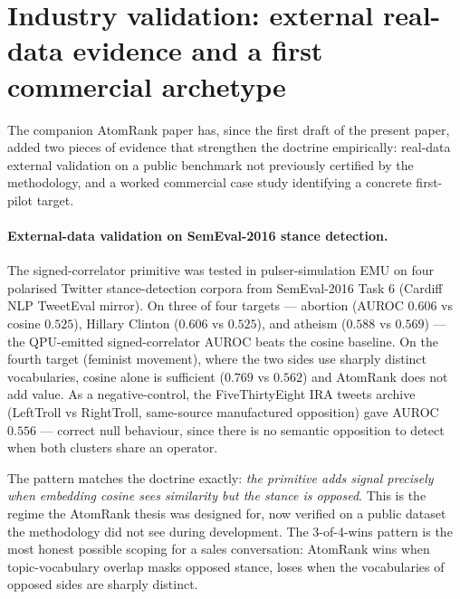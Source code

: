 \documentclass[10pt]{article}
\begin{document}
\section{Industry validation: external real-data evidence and a first commercial archetype}\label{sec:industry}

The companion AtomRank paper \cite{jurczak2026atomrank} has, since the first draft of the present paper, added two pieces of evidence that strengthen the doctrine empirically: real-data external validation on a public benchmark not previously certified by the methodology, and a worked commercial case study identifying a concrete first-pilot target.

\paragraph{External-data validation on SemEval-2016 stance detection.}
The signed-correlator primitive was tested in pulser-simulation EMU on four polarised Twitter stance-detection corpora from SemEval-2016 Task 6 (Cardiff NLP TweetEval mirror). On three of four targets --- abortion (AUROC $0.606$ vs cosine $0.525$), Hillary Clinton ($0.606$ vs $0.525$), and atheism ($0.588$ vs $0.569$) --- the QPU-emitted signed-correlator AUROC beats the cosine baseline. On the fourth target (feminist movement), where the two sides use sharply distinct vocabularies, cosine alone is sufficient ($0.769$ vs $0.562$) and AtomRank does not add value. As a negative-control, the FiveThirtyEight IRA tweets archive (LeftTroll vs RightTroll, same-source manufactured opposition) gave AUROC $0.556$ --- correct null behaviour, since there is no semantic opposition to detect when both clusters share an operator.

The pattern matches the doctrine exactly: \emph{the primitive adds signal precisely when embedding cosine sees similarity but the stance is opposed}. This is the regime the AtomRank thesis was designed for, now verified on a public dataset the methodology did not see during development. The 3-of-4-wins pattern is the most honest possible scoping for a sales conversation: AtomRank wins when topic-vocabulary overlap masks opposed stance, loses when the vocabularies of opposed sides are sharply distinct.
\end{document}
